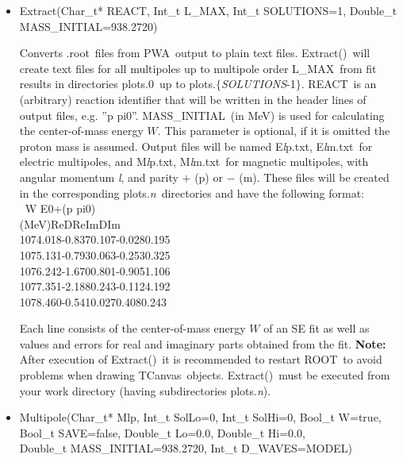 \documentclass[a4paper,10pt]{article}
\def\PWA{\ttfamily PWA\rmfamily\ }
\def\bl{\phantom{0}}
\def\tt{\ttfamily}
\def\rm{\rmfamily}
\begin{document}
\begin{itemize}
\item
\tt Extract(Char\_t* REACT, Int\_t L\_MAX, Int\_t SOLUTIONS=1, Double\_t MASS\_INITIAL=938.2720)\rm

Converts \tt .root\rm\ files from \PWA output to plain text files. \tt Extract()\rm\ will
create text files for all multipoles up to multipole order \tt L\_MAX\rm\ from fit results in directories
\tt plots.0\rm\ up to \tt plots.$\lbrace$\textit{SOLUTIONS}-1$\rbrace$\rm.
\tt REACT\rm\ is an (arbitrary) reaction identifier that will be written in the header lines of output files,
e.g. \tt ''p pi0''\rm. \tt MASS\_INITIAL\rm\ (in MeV) is used for calculating the center-of-mass energy $W$. This parameter 
is optional, if it is omitted the proton mass is assumed.
Output files will be named
\tt E\textit{l}p.txt\rm,
\tt E\textit{l}m.txt\rm\ 
for electric multipoles, and
\tt M\textit{l}p.txt\rm,
\tt M\textit{l}m.txt\rm\ 
for magnetic multipoles, with angular momentum \tt\textit{l}\rm, and parity
$+$ (\tt p\rm) or $-$ (\tt m\rm). These files
will be created in the corresponding 
\tt plots.\textit{n}\rm\ directories and have the following format:\\

\tt
$\bl$\bl\bl W \bl\bl\bl\bl\bl\bl\bl\bl\bl\bl\bl\bl\bl\bl\bl E0+(p pi0)\\
\bl(MeV)\bl\bl\bl\bl\bl\bl Re\bl\bl\bl\bl\bl\bl DRe\bl\bl\bl\bl\bl\bl Im\bl\bl\bl\bl\bl\bl DIm\\
1074.018\bl\bl\bl -0.837\bl\bl\bl 0.107\bl\bl\bl-0.028\bl\bl\bl 0.195\\
1075.131\bl\bl\bl -0.793\bl\bl\bl 0.063\bl\bl\bl-0.253\bl\bl\bl 0.325\\
1076.242\bl\bl\bl -1.670\bl\bl\bl 0.801\bl\bl\bl-0.905\bl\bl\bl 1.106\\
1077.351\bl\bl\bl -2.188\bl\bl\bl 0.243\bl\bl\bl-0.112\bl\bl\bl 4.192\\
1078.460\bl\bl\bl -0.541\bl\bl\bl 0.027\bl\bl\bl\bl 0.408\bl\bl\bl 0.243\\
\rm

Each line consists of the center-of-mass energy $W$ of an SE fit as well as values and errors for real and imaginary
parts obtained from the fit. \textbf{Note:} After execution of \tt Extract()\rm\ it is recommended to restart
\tt ROOT\rm\ to avoid problems when drawing \tt TCanvas\rm\ objects. \tt Extract()\rm\ must be executed from your
work directory (having subdirectories \tt plots.\textit{n}\rm).

\item
\tt Multipole(Char\_t* Mlp, Int\_t SolLo=0, Int\_t SolHi=0, Bool\_t W=true,\\
\phantom{Multipole(}Bool\_t SAVE=false, Double\_t Lo=0.0, Double\_t Hi=0.0,\\
\phantom{Multipole(}Double\_t MASS\_INITIAL=938.2720, Int\_t D\_WAVES=MODEL)\rm


\end{itemize}
\end{document}
